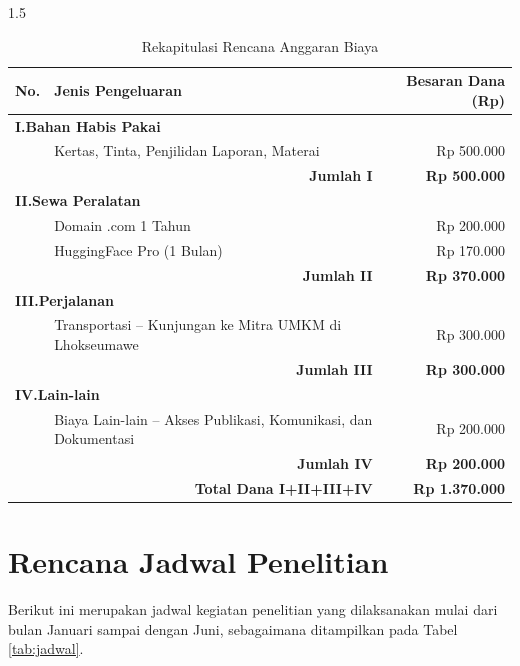\documentclass[12pt, a4paper, onecolumn, oneside]{report}
\begin{document}
\begin{spacing}{1.5}
\begin{table}[H]
\centering
\caption{Rekapitulasi Rencana Anggaran Biaya}
\label{tab:biaya}
\begin{tabularx}{\textwidth}{|c|X|r|}
\hline
\textbf{No.} & \textbf{Jenis Pengeluaran} & \textbf{Besaran Dana (Rp)} \\
\hline
\multicolumn{3}{|l|}{\textbf{I.\quad Bahan Habis Pakai}} \\
\hline
 & Kertas, Tinta, Penjilidan Laporan, Materai & Rp 500.000 \\
\hline
\multicolumn{2}{|r|}{\textbf{Jumlah I}} & \textbf{Rp 500.000} \\
\hline
\multicolumn{3}{|l|}{\textbf{II.\quad Sewa Peralatan}} \\
\hline
 & Domain .com 1 Tahun & Rp 200.000 \\
\hline
 & HuggingFace Pro (1 Bulan) & Rp 170.000 \\
\hline
\multicolumn{2}{|r|}{\textbf{Jumlah II}} & \textbf{Rp 370.000} \\
\hline
\multicolumn{3}{|l|}{\textbf{III.\quad Perjalanan}} \\
\hline
 & Transportasi -- Kunjungan ke Mitra UMKM di Lhokseumawe & Rp 300.000 \\
\hline
\multicolumn{2}{|r|}{\textbf{Jumlah III}} & \textbf{Rp 300.000} \\
\hline
\multicolumn{3}{|l|}{\textbf{IV.\quad Lain-lain}} \\
\hline
 & Biaya Lain-lain -- Akses Publikasi, Komunikasi, dan Dokumentasi & Rp 200.000 \\
\hline
\multicolumn{2}{|r|}{\textbf{Jumlah IV}} & \textbf{Rp 200.000} \\
\hline
\multicolumn{2}{|r|}{\textbf{Total Dana I+II+III+IV}} & \textbf{Rp 1.370.000} \\
\hline
\end{tabularx}
\end{table}

\section{Rencana Jadwal Penelitian}

Berikut ini merupakan jadwal kegiatan penelitian yang dilaksanakan mulai dari bulan Januari sampai dengan Juni, sebagaimana ditampilkan pada Tabel \ref{tab:jadwal}.


\end{spacing}
\end{document}
